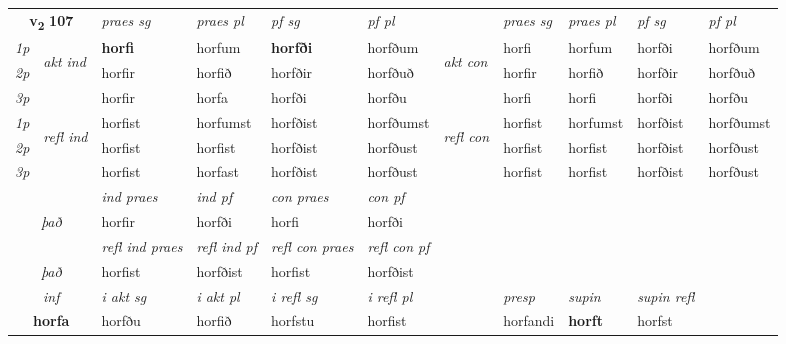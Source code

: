 \noindent
\begin{tabular}{lllllllllll} \toprule
\multicolumn{2}{c}{\textbf{v{\textsubscript{2}}} \Large{\textbf{107}}}  &  \textit{praes sg}  & \textit{praes pl}  &\textit{ pf sg} & \textit{pf pl} &  &  \textit{praes sg}  & \textit{praes pl}  & \textit{pf sg} & \textit{pf pl } \\*
	\cmidrule{3-6} \cmidrule{8-11}
 {\textit{1p}} & \multirow{3}{*}{\begin{turn}{90}\textit{akt ind}\end{turn}} & \textbf{horfi} & horfum & \textbf{horfði} & horfðum & \multirow{3}{*}{\begin{turn}{90}\textit{akt con}\end{turn}} &horfi & horfum & horfði & horfðum\\*
 {\textit{2p}} &  &  horfir  & horfið & horfðir & horfðuð & & horfir & horfið & horfðir & horfðuð \\*
{\textit{3p}} &  & horfir & horfa & horfði & horfðu & & horfi & horfi& horfði & horfðu \\*
\cmidrule{3-6} \cmidrule{8-11}
 {\textit{1p}} & \multirow{3}{*}{\begin{turn}{90}\textit{refl ind}\end{turn}}  & horfist & horfumst & horfðist & horfðumst & \multirow{3}{*}{\begin{turn}{90}\textit{refl con}\end{turn}}  &horfist & horfumst & horfðist & horfðumst \\*
 {\textit{2p}} &  & horfist & horfist & horfðist & horfðust & &horfist & horfist & horfðist & horfðust \\*
 {\textit{3p}}  & & horfist & horfast & horfðist & horfðust & & horfist & horfist& horfðist & horfðust \\*
\cmidrule{3-6} \cmidrule{8-11}

   & &  \textit{ind praes} & \textit{ind pf} & \textit{con praes} & \textit{con pf} \\*
\multicolumn{2}{c}{ \textit{það} } & horfir & horfði & horfi & horfði \\*

\cmidrule{3-6}
 & & \textit{refl ind praes} & \textit{refl ind pf} & \textit{refl con praes} & \textit{refl con pf} \\*
 \multicolumn{2}{c}{ \textit{það} }& horfist & horfðist & horfist & horfðist \\*

\cmidrule{3-10}
   \multicolumn{2}{c}{\textit{inf}}  & \textit{i akt sg} & \textit{i akt pl} & \textit{i refl sg} & \textit{i refl pl} && \textit{presp} & \textit{supin} & \textit{supin refl}  \\*
  \multicolumn{2}{c}{\textbf{horfa}} & horfðu  & horfið & horfstu & horfist && horfandi &  \textbf{horft} & horfst  \\*
\end{tabular}

